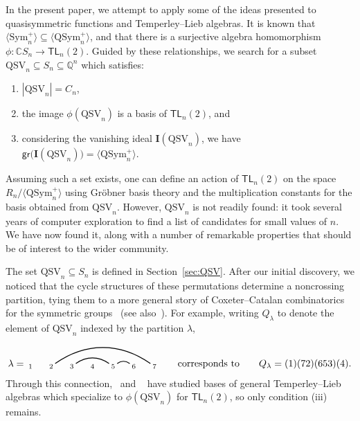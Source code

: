 \documentclass[submission]{FPSAC2024}
\theoremstyle{definition}
\theoremstyle{remark}
\numberwithin{equation}{section}
\newcommand{\CC}{\mathbb{C}}
\newcommand{\QQ}{\mathbb{Q}}
\newcommand{\TL}{\mathsf{TL}}
\newcommand{\Sym}{\mathrm{Sym}}
\newcommand{\QSym}{\mathrm{QSym}}
\newcommand{\QSV}{\mathrm{QSV}}
\begin{document}
In the present paper, we attempt to apply some of the ideas presented to quasisymmetric functions and Temperley--Lieb algebras. 
It is known  that $\langle \Sym_{n}^{+} \rangle \subseteq \langle \QSym_{n}^{+} \rangle$, and that there is a surjective algebra homomorphism $\phi: \CC S_{n} \to \TL_{n}(2)$. 
Guided by these relationships, we search for a subset $\QSV_{n} \subseteq S_{n} \subseteq \QQ^{n}$ which satisfies:
\begin{enumerate}[ label=(\roman*)]
\item $|\QSV_{n}| = C_{n}$,
\item the image $\phi(\QSV_{n})$ is a basis of $\TL_{n}(2)$, and

\item considering the vanishing ideal $\mathbf{I}(\QSV_{n})$, we have $\mathsf{gr}\big(\mathbf{I}(\QSV_{n})\big) = \langle \QSym_{n}^{+} \rangle$.

\end{enumerate}
Assuming such a set exists, one can define an action of $\TL_{n}(2)$ on the space $R_{n}\big/\langle \QSym_{n}^{+} \rangle$ using Gr\"{o}bner basis theory and the multiplication constants for the basis obtained from $\QSV_{n}$.  
However, $\QSV_{n}$ is not readily found: it took several years of computer exploration to find a list of candidates for small values of $n$.  
We have now found it, along with a number of remarkable properties that should be of interest to the wider community.

The set $\QSV_{n} \subseteq S_{n}$ is defined in Section~\ref{sec:QSV}.  
After our initial discovery, we noticed that the cycle structures of these permutations determine a noncrossing partition, tying them to a more general story of Coxeter--Catalan combinatorics for the symmetric groups~\cite{Baine} (see also~\cite{McCammond}).  
For example, writing $Q_{\lambda}$ to denote the element of $\QSV_{n}$ indexed by the partition $\lambda$,
\[
\lambda = \begin{tikzpicture}[scale = 0.75, baseline = 0.75*-0.2]
\foreach \x in {1, ..., 7}{\draw[fill] (\x - 1, 0) node[inner sep = 2pt] (\x) {$\scriptstyle \x$};}
\foreach \i\j in {5/6, 3/5,2/7}{\draw[thick] (\i) to[out = 35, in = 145] (\j);}
\end{tikzpicture}
\qquad\text{corresponds to}\qquad
Q_{\lambda} = (1)(72)(653)(4).
\]
Through this connection,~\cite{GW16, Gobet} and ~\cite{Z02} have studied bases of general Temperley--Lieb algebras which specialize to $\phi(\QSV_{n})$ for $\TL_{n}(2)$, so only condition (iii) remains.
\end{document}
